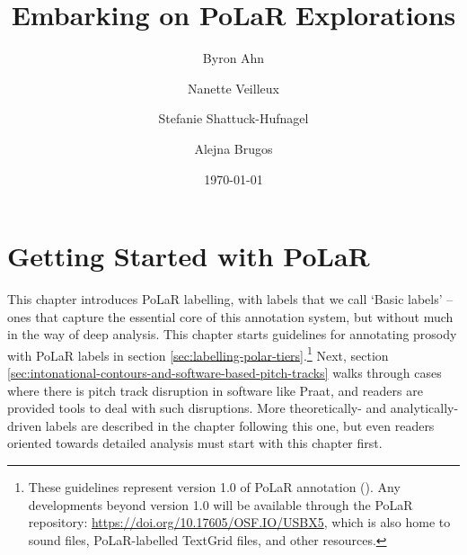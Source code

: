 \documentclass[11pt, twoside]{memoir}
\def\THIStitle{Embarking on PoLaR Explorations}
\def\THISsubtitle{A Framework for Intonational Annotation and Analysis}
\begin{document}
\frontmatter
{}

\title{\THIStitle}
\author{Byron Ahn \and Nanette Veilleux \and Stefanie Shattuck-Hufnagel \and Alejna Brugos}
\date{\today}


\tableofcontents
\newpage
\listoffigures
\listoftables
\newpage

\mainmatter

\chapter{Getting Started with PoLaR}\label{ch:basics}

This chapter introduces PoLaR labelling, with labels that we call ‘Basic labels’ – ones that capture the essential core of this annotation system, but without much in the way of deep analysis. This chapter starts guidelines for annotating prosody with PoLaR labels in section  \ref{sec:labelling-polar-tiers}.\footnote{These guidelines represent version 1.0 of PoLaR annotation (\citealt{ahn-21}). Any developments beyond version 1.0 will be available through the PoLaR repository: \href{https://doi.org/10.17605/OSF.IO/USBX5}{https://doi.org/10.17605/OSF.IO/USBX5}, which is also home to sound files, PoLaR-labelled TextGrid files, and other resources.} Next, section \ref{sec:intonational-contours-and-software-based-pitch-tracks} walks through cases where there is pitch track disruption in software like Praat, and readers are provided tools to deal with such disruptions. More theoretically- and analytically-driven labels are described in the chapter following this one, but even readers oriented towards detailed analysis must start with this chapter first.
\end{document}
